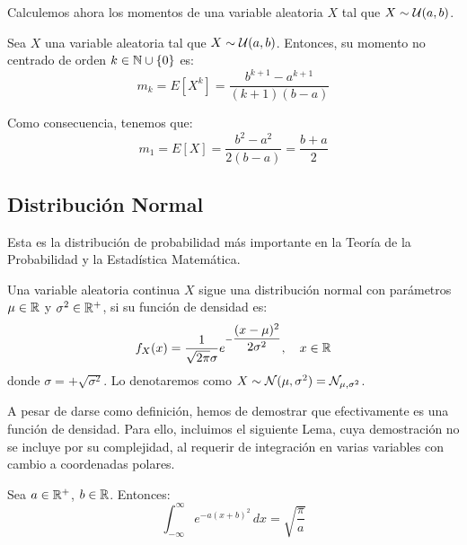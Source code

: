 \noindent
Calculemos ahora los momentos de una variable aleatoria $X$ tal que $X\sim \mathcal{U}(a,b)$.
\begin{prop}
    Sea $X$ una variable aleatoria tal que $X\sim \mathcal{U}(a,b)$. Entonces, su momento no centrado de orden $k\in \mathbb{N}\cup \{0\}$ es:
    \begin{equation*}
        m_k = E[X^k] = \dfrac{b^{k+1} - a^{k+1}}{(k+1)(b-a)}
    \end{equation*}
\end{prop}

\noindent

Como consecuencia, tenemos que:
\begin{equation*}
    m_1 = E[X] = \dfrac{b^2 - a^2}{2(b-a)} = \dfrac{b+a}{2}
\end{equation*}


\subsection{Distribución Normal}

\noindent
Esta es la distribución de probabilidad más importante en la Teoría de la Probabilidad y la Estadística Matemática.

\begin{definicion}
    Una variable aleatoria continua $X$ sigue una distribución normal con parámetros $\mu\in \mathbb{R}$ y $\sigma^2 \in \mathbb{R}^+$, si su función de densidad es:
    \begin{equation*}
        f_X(x) = \dfrac{1}{\sqrt{2\pi}\sigma} e^{-\dfrac{(x-\mu)^2}{2\sigma^2}}, \quad x\in \mathbb{R}
    \end{equation*}
    donde $\sigma=+\sqrt{\sigma^2}$.
    Lo denotaremos como $X\sim \mathcal{N}(\mu,\sigma^2)=\mathcal{N}_{\mu, \sigma^2}$.
\end{definicion}

A pesar de darse como definición, hemos de demostrar que efectivamente es una función de densidad.
Para ello, incluimos el siguiente Lema, cuya demostración no se incluye por su complejidad,
al requerir de integración en varias variables con cambio a coordenadas polares.
\begin{lema}
    Sea $a\in\mathbb{R}^+$, $b\in \mathbb{R}$. Entonces:
    \begin{equation*}
        \int_{-\infty}^{\infty} e^{-a(x+b)^2} \, dx = \sqrt{\dfrac{\pi}{a}}
    \end{equation*}
\end{lema}

